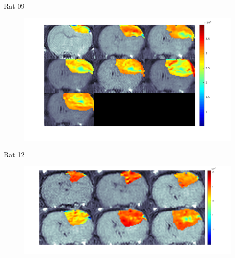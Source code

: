 \documentclass{beamer}
\begin{document}
\begin{frame}{Rat 09}
    \begin{minipage}[t][.7\textheight][t]{\textwidth}
    	\begin{figure}
    	\centering
    	\includegraphics[width=.9\textwidth]{../../mouse-data/Montage09.png}
    	\end{figure}
	\end{minipage}  
\end{frame}

\begin{frame}{Rat 12}
    \begin{minipage}[t][.7\textheight][t]{\textwidth}
    	\begin{figure}
    	\centering
    	\includegraphics[width=.9\textwidth]{../../mouse-data/Montage12.png}
    	\end{figure}
	\end{minipage}  
\end{frame}
\end{document}
